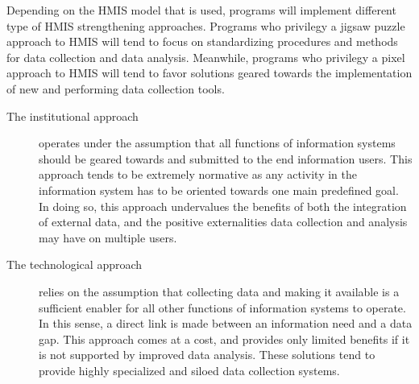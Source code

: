 Depending on the HMIS model that is used, programs will implement different type of HMIS strengthening approaches. Programs who privilegy a jigsaw puzzle approach to HMIS will tend to focus on standardizing procedures and methods for data collection and data analysis. Meanwhile, programs who privilegy a pixel approach to HMIS will tend to favor solutions geared towards the implementation of new and performing data collection tools.

\begin{description}
	\item[The institutional approach] operates under the assumption that all functions of information systems should be geared towards and submitted to the end information users. This approach tends to be extremely normative as any activity in the information system has to be oriented towards one main predefined goal. In doing so, this approach undervalues the benefits of both the integration of external data, and the positive externalities data collection and analysis may have on multiple users.



	\item[The technological approach] relies on the assumption that collecting data and making it available is a sufficient enabler for all other functions of information systems to operate. In this sense, a direct link is made between an information need and a data gap. This approach comes at a cost, and provides only limited benefits if it is not supported by improved data analysis. These solutions tend to provide highly specialized and siloed data collection systems.

\end{description}

